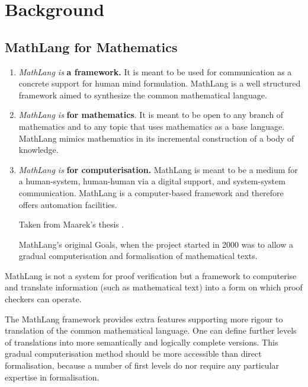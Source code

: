 \chapter{Background}
\label{ch:background}



\section{MathLang for Mathematics}
\label{sec:mathlangbackground}

\begin{enumerate}
\item \textit{MathLang is} \textbf{a framework.} It is meant to be used for communication as a concrete support for human mind formulation. MathLang is a well structured framework aimed to synthesize the common mathematical language.

\item \textit{MathLang is} \textbf{for mathematics}. It is meant to be open to any branch of mathematics and to any topic that uses mathematics as a base language. MathLang mimics mathematics in its incremental construction of a body of knowledge.

\item \textit{MathLang is} \textbf{for computerisation.} MathLang is meant to be a medium for a human-system, human-human via a digital support, and system-system communication. MathLang is a computer-based framework and therefore offers automation facilities.

Taken from Maarek's thesis \cite{manuelphd}.

MathLang's original Goals, when the project started in 2000 was to allow a gradual computerisation and formalisation of mathematical texts.

\end{enumerate}

MathLang is not a system for proof verification but a framework to computerise and translate information (such as mathematical text) into a form on which proof checkers can operate.

The MathLang framework provides extra features supporting more rigour to translation of the common mathematical language. One can define further levels of translations into more semantically and logically complete versions. This gradual computerisation method should be more accessible than direct formalisation, because a number of first levels do nor require any particular expertise in formalisation.

